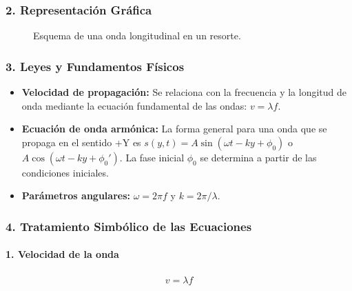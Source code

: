 \subsubsection*{2. Representación Gráfica}
\begin{figure}[H]
    \centering
    \caption{Esquema de una onda longitudinal en un resorte.}
\end{figure}

\subsubsection*{3. Leyes y Fundamentos Físicos}
\begin{itemize}
    \item \textbf{Velocidad de propagación:} Se relaciona con la frecuencia y la longitud de onda mediante la ecuación fundamental de las ondas: $v = \lambda f$.
    \item \textbf{Ecuación de onda armónica:} La forma general para una onda que se propaga en el sentido +Y es $s(y,t) = A\sin(\omega t - ky + \phi_0)$ o $A\cos(\omega t - ky + \phi_0')$. La fase inicial $\phi_0$ se determina a partir de las condiciones iniciales.
    \item \textbf{Parámetros angulares:} $\omega = 2\pi f$ y $k = 2\pi / \lambda$.
\end{itemize}

\subsubsection*{4. Tratamiento Simbólico de las Ecuaciones}
\paragraph{1. Velocidad de la onda}
\begin{gather}
    v = \lambda f
\end{gather}
